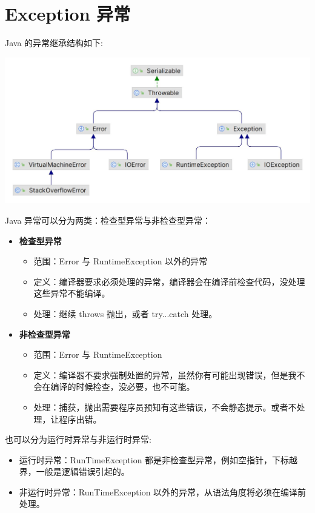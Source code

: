 \section{Exception 异常}

Java 的异常继承结构如下:

\includegraphics[width=0.9\linewidth]{../../../imgs/Throwable.jpg}

Java 异常可以分为两类：检查型异常与非检查型异常：
\begin{itemize}
    \item \textbf{检查型异常}
    \begin{itemize}
        \item 范围：Error 与 RuntimeException 以外的异常
        \item 定义：编译器要求必须处理的异常，编译器会在编译前检查代码，没处理这些异常不能编译。
        \item 处理：继续 throws 抛出，或者 try...catch 处理。
    \end{itemize}
    \item \textbf{非检查型异常}
    \begin{itemize}
        \item 范围：Error 与 RuntimeException
        \item 定义：编译器不要求强制处置的异常，虽然你有可能出现错误，但是我不会在编译的时候检查，没必要，也不可能。
        \item 处理：捕获，抛出需要程序员预知有这些错误，不会静态提示。或者不处理，让程序出错。
    \end{itemize}
\end{itemize}

也可以分为运行时异常与非运行时异常:

\begin{itemize}
    \item 运行时异常：RunTimeException 都是非检查型异常，例如空指针，下标越界，一般是逻辑错误引起的。
    \item 非运行时异常：RunTimeException 以外的异常，从语法角度将必须在编译前处理。
\end{itemize}

